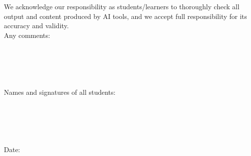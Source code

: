 \documentclass{midl} %
\begin{document}
\noindent We acknowledge our responsibility as students/learners to thoroughly check all output and content produced by AI tools, and we accept full responsibility for its accuracy and validity.\\

\noindent Any comments:\\\\\\\\\\\\


\noindent Names and signatures of all students: \\\\\\\\\\\\



\noindent Date: 
\end{document}
